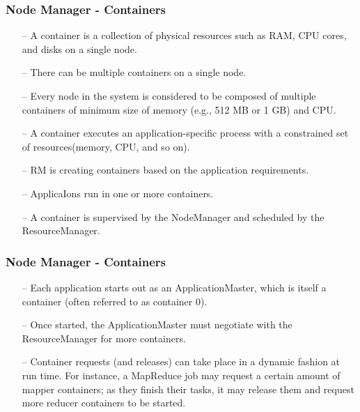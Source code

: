 \begin{frame}[c]{ }
	\frametitle{Node Manager - Containers }
	
	{\footnotesize
		\begin{itemize}  [<+->]
			\item [--] A container is a collection of physical resources such as RAM, CPU cores, and disks on a single node.
			\item [--] There can be multiple containers on a single node.
			\item [--] Every node in the system is considered to be composed of multiple containers of minimum size of memory (e.g., 512 MB or 1 GB) and CPU.
			\item [--] A container executes an application-specific process with a constrained set of resources(memory, CPU, and so on).
			\item [--] RM is creating containers based on the application requirements. 
			\item [--] ApplicaIons run in one or more containers.
			\item [--] A container is supervised by the NodeManager and scheduled by the ResourceManager.
		\end{itemize}
	}
\end{frame}
\begin{frame}[c]{ }
	\frametitle{Node Manager - Containers }
	
	{\footnotesize
		\begin{itemize}  [<+->]
			\item [--] Each application starts out as an ApplicationMaster, which is itself a container (often referred to as container 0).
			\item [--] Once started, the ApplicationMaster must negotiate with the ResourceManager for more containers.
			\item [--] Container requests (and releases) can take place in a dynamic fashion at run time. For instance, a MapReduce job may request a certain amount of mapper containers; as they finish their tasks, it may release them and request more reducer containers to be started.
		\end{itemize}
	}
\end{frame}
